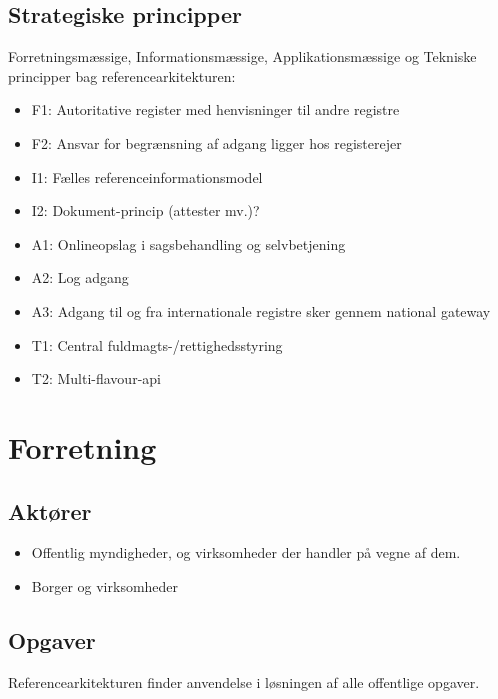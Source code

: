 \subsection{Strategiske principper}\label{strategiske-principper}

Forretningsmæssige, Informationsmæssige, Applikationsmæssige og Tekniske
principper bag referencearkitekturen:

\begin{itemize}
\tightlist
\item
  F1: Autoritative register med henvisninger til andre registre
\item
  F2: Ansvar for begrænsning af adgang ligger hos registerejer
\item
  I1: Fælles referenceinformationsmodel
\item
  I2: Dokument-princip (attester mv.)?
\item
  A1: Onlineopslag i sagsbehandling og selvbetjening
\item
  A2: Log adgang
\item
  A3: Adgang til og fra internationale registre sker gennem national
  gateway
\item
  T1: Central fuldmagts-/rettighedsstyring
\item
  T2: Multi-flavour-api
\end{itemize}

\section{Forretning}\label{forretning}

\subsection{Aktører}\label{aktuxf8rer}

\begin{itemize}
\tightlist
\item
  Offentlig myndigheder, og virksomheder der handler på vegne af dem.
\item
  Borger og virksomheder
\end{itemize}

\subsection{Opgaver}\label{opgaver}

Referencearkitekturen finder anvendelse i løsningen af alle offentlige
opgaver.

